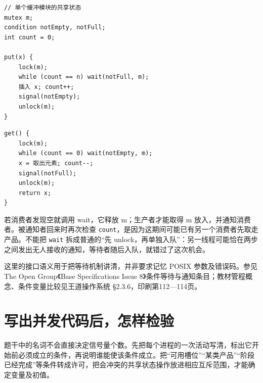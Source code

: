 \par\medskip\noindent\begin{minipage}{\linewidth}
\begin{verbatim}
// 单个缓冲模块的共享状态
mutex m;
condition notEmpty, notFull;
int count = 0;

put(x) {
    lock(m);
    while (count == n) wait(notFull, m);
    插入 x; count++;
    signal(notEmpty);
    unlock(m);
}
\end{verbatim}
\end{minipage}\par\medskip

\par\medskip\noindent\begin{minipage}{\linewidth}
\begin{verbatim}
get() {
    lock(m);
    while (count == 0) wait(notEmpty, m);
    x = 取出元素; count--;
    signal(notFull);
    unlock(m);
    return x;
}
\end{verbatim}
\end{minipage}\par\medskip

若消费者发现空就调用 wait，它释放 m；生产者才能取得 m 放入，并通知消费者。被通知者回来时再次检查 \texttt{count}，是因为这期间可能已有另一个消费者先取走产品。不能把 \texttt{wait} 拆成普通的``先 unlock，再单独入队''：另一线程可能恰在两步之间发出无人接收的通知，等待者随后入队，就错过了这次机会。

这里的接口语义用于把等待机制讲清，并非要求记忆 POSIX 参数及错误码。参见 The Open Group《Base Specifications Issue 8》条件等待与通知条目；教材管程概念、条件变量比较见王道操作系统 §2.3.6，印刷第112---114页。

\section{写出并发代码后，怎样检验}\label{sec-method}

题干中的名词不会直接决定信号量个数。先把每个进程的一次活动写清，标出它开始前必须成立的条件，再说明谁能使该条件成立。把``可用槽位''``某类产品''``阶段已经完成''等条件转成许可，把会冲突的共享状态操作放进相应互斥范围，才能确定变量及初值。

